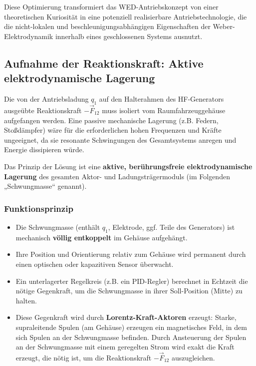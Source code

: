 \documentclass[11pt, a4paper]{article}
\begin{document}
Diese Optimierung transformiert das WED-Antriebskonzept von einer theoretischen Kuriosität in eine potenziell realisierbare Antriebstechnologie, die die nicht-lokalen und
beschleunigungsabhängigen Eigenschaften der Weber-Elektrodynamik innerhalb eines geschlossenen Systems ausnutzt.


\subsection{Aufnahme der Reaktionskraft: Aktive elektrodynamische Lagerung}

Die von der Antriebsladung $q_1$ auf den Halterahmen des HF-Generators ausgeübte Reaktionskraft $-\vec{F}_{12}$ muss isoliert vom Raumfahrzeuggehäuse aufgefangen werden. Eine passive mechanische Lagerung (z.B. Federn, Stoßdämpfer) wäre für die erforderlichen hohen Frequenzen und Kräfte ungeeignet, da sie resonante Schwingungen des Gesamtsystems anregen und Energie dissipieren würde.

Das Prinzip der Lösung ist eine \textbf{aktive, berührungsfreie elektrodynamische Lagerung} des gesamten Aktor- und Ladungsträgermoduls (im Folgenden „Schwungmasse“ genannt).

\subsubsection*{Funktionsprinzip}

\begin{itemize}
    \item Die Schwungmasse (enthält $q_1$, Elektrode, ggf. Teile des Generators) ist mechanisch \textbf{völlig entkoppelt} im Gehäuse aufgehängt.
    \item Ihre Position und Orientierung relativ zum Gehäuse wird permanent durch einen optischen oder kapazitiven Sensor überwacht.
    \item Ein unterlagerter Regelkreis (z.B. ein PID-Regler) berechnet in Echtzeit die nötige Gegenkraft, um die Schwungmasse in ihrer Soll-Position (Mitte) zu halten.
    \item Diese Gegenkraft wird durch \textbf{Lorentz-Kraft-Aktoren} erzeugt: Starke, supraleitende Spulen (am Gehäuse) erzeugen ein magnetisches Feld, in dem sich Spulen an der Schwungmasse befinden. Durch Ansteuerung der Spulen an der Schwungmasse mit einem geregelten Strom wird exakt die Kraft erzeugt, die nötig ist, um die Reaktionskraft $-\vec{F}_{12}$ auszugleichen.
\end{itemize}
\end{document}
